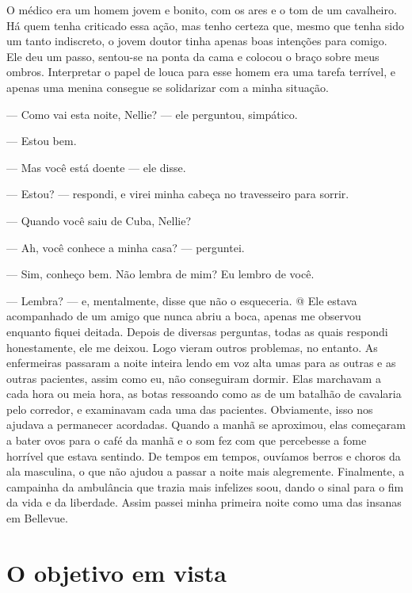 O médico era um homem jovem e bonito, com os ares e o tom de um
cavalheiro. Há quem tenha criticado essa ação, mas tenho certeza que,
mesmo que tenha sido um tanto indiscreto, o jovem doutor tinha apenas
boas intenções para comigo. Ele deu um passo, sentou-se na ponta da cama
e colocou o braço sobre meus ombros. Interpretar o papel de louca para
esse homem era uma tarefa terrível, e apenas uma menina consegue se
solidarizar com a minha situação.

--- Como vai esta noite, Nellie? --- ele perguntou, simpático.

--- Estou bem.

--- Mas você está doente --- ele disse.

--- Estou? --- respondi, e virei minha cabeça no travesseiro para
sorrir.

--- Quando você saiu de Cuba, Nellie?

--- Ah, você conhece a minha casa? --- perguntei.

--- Sim, conheço bem. Não lembra de mim? Eu lembro de você.

--- Lembra? --- e, mentalmente, disse que não o esqueceria. @ Ele estava
acompanhado de um amigo que nunca abriu a boca, apenas me observou
enquanto fiquei deitada. Depois de diversas perguntas, todas as quais
respondi honestamente, ele me deixou. Logo vieram outros problemas, no
entanto. As enfermeiras passaram a noite inteira lendo em voz alta umas
para as outras e as outras pacientes, assim como eu, não conseguiram
dormir. Elas marchavam a cada hora ou meia hora, as botas ressoando como
as de um batalhão de cavalaria pelo corredor, e examinavam cada uma das
pacientes. Obviamente, isso nos ajudava a permanecer acordadas. Quando a
manhã se aproximou, elas começaram a bater ovos para o café da manhã e o
som fez com que percebesse a fome horrível que estava sentindo. De
tempos em tempos, ouvíamos berros e choros da ala masculina, o que não
ajudou a passar a noite mais alegremente. Finalmente, a campainha da
ambulância que trazia mais infelizes soou, dando o sinal para o fim da
vida e da liberdade. Assim passei minha primeira noite como uma das
insanas em Bellevue.

\label{section-4}

\chapter{O objetivo em
vista}\label{capuxedtulo-vii-o-objetivo-em-vista}

